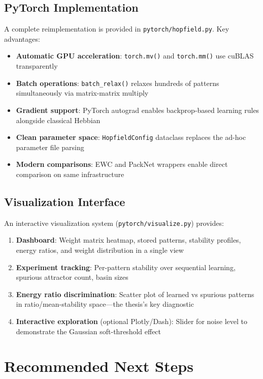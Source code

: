 \documentclass[11pt,a4paper]{article}
\begin{document}
\subsection{PyTorch Implementation}

A complete reimplementation is provided in \texttt{pytorch/hopfield.py}. Key advantages:

\begin{itemize}
    \item \textbf{Automatic GPU acceleration}: \texttt{torch.mv()} and \texttt{torch.mm()} use cuBLAS transparently
    \item \textbf{Batch operations}: \texttt{batch\_relax()} relaxes hundreds of patterns simultaneously via matrix-matrix multiply
    \item \textbf{Gradient support}: PyTorch autograd enables backprop-based learning rules alongside classical Hebbian
    \item \textbf{Clean parameter space}: \texttt{HopfieldConfig} dataclass replaces the ad-hoc parameter file parsing
    \item \textbf{Modern comparisons}: EWC and PackNet wrappers enable direct comparison on same infrastructure
\end{itemize}

\subsection{Visualization Interface}

An interactive visualization system (\texttt{pytorch/visualize.py}) provides:

\begin{enumerate}
    \item \textbf{Dashboard}: Weight matrix heatmap, stored patterns, stability profiles, energy ratios, and weight distribution in a single view
    \item \textbf{Experiment tracking}: Per-pattern stability over sequential learning, spurious attractor count, basin sizes
    \item \textbf{Energy ratio discrimination}: Scatter plot of learned vs spurious patterns in ratio/mean-stability space---the thesis's key diagnostic
    \item \textbf{Interactive exploration} (optional Plotly/Dash): Slider for noise level to demonstrate the Gaussian soft-threshold effect
\end{enumerate}

\section{Recommended Next Steps}
\end{document}
